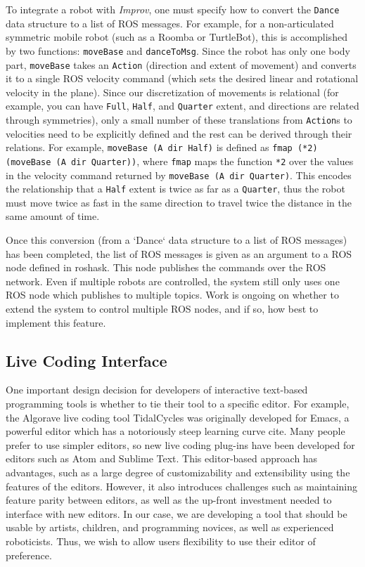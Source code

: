 \documentclass[sigconf]{acmart}
\begin{document}
To integrate a robot with \emph{Improv}, one must
specify how to convert the \texttt{Dance} data structure to a list of ROS
messages. For example, for a non-articulated symmetric mobile robot (such as a Roomba or
TurtleBot), this is accomplished by two functions: \texttt{moveBase} and
\texttt{danceToMsg}. Since the robot has only one body part, \texttt{moveBase}
takes an \texttt{Action} (direction and extent of movement) and converts it to a
single ROS velocity command (which sets the desired linear and rotational
velocity in the plane). Since our discretization of movements is relational (for
example, you can have \texttt{Full}, \texttt{Half}, and \texttt{Quarter} extent,
and directions are related through symmetries), only a small number of these
translations from \texttt{Action}s to velocities need to be explicitly defined
and the rest can be derived through their relations. For example,
\texttt{moveBase (A dir Half)} is defined as \texttt{fmap (*2) (moveBase (A dir
Quarter))},
where \texttt{fmap} maps the function \texttt{*2} over the values in the velocity
command returned by \texttt{moveBase (A dir Quarter)}. This encodes the relationship
that a \texttt{Half} extent is twice as far as a \texttt{Quarter}, thus the
robot must move twice as fast in the same direction to travel twice the distance
in the same amount of time.

Once this conversion (from a `Dance` data structure to a list of ROS messages)
has been completed, the list of ROS messages is given as an argument to a ROS
node defined in roshask. This node publishes the commands over the ROS network.
Even if multiple robots are controlled, the system still only uses one ROS node
which publishes to multiple topics. Work is ongoing on whether to extend the
system to control multiple ROS nodes, and if so, how best to implement this
feature.

\subsection{Live Coding Interface}\label{live-coding-interface}

One important design decision for developers of interactive text-based
programming tools is whether to tie their tool to a specific editor. For
example, the Algorave live coding tool TidalCycles was originally
developed for Emacs, a powerful editor which has a notoriously steep
learning curve {\color{red} cite}. Many people prefer to use simpler editors, so new
live coding plug-ins have been developed for editors such as Atom and
Sublime Text. This editor-based approach has advantages, such as a large
degree of customizability and extensibility using the features of the
editors. However, it also introduces challenges such as maintaining
feature parity between editors, as well as the up-front investment
needed to interface with new editors. In our case, we are developing a
tool that should be usable by artists, children, and programming
novices, as well as experienced roboticists. Thus, we wish to allow
users flexibility to use their editor of preference.
\end{document}
